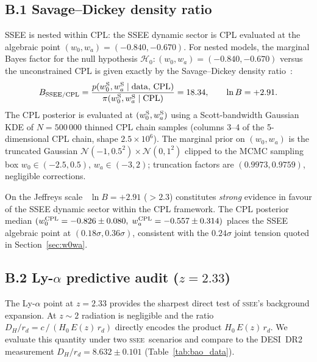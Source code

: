 \documentclass[12pt,a4paper]{article}
\newcommand{\SSEE}{\ifmmode\mathrm{SSEE}\else\textsc{ssee}\fi}
\begin{document}
\subsection*{B.1 Savage--Dickey density ratio}

SSEE is nested within CPL: the SSEE dynamic sector is CPL evaluated at
the algebraic point $(w_0,w_a)=(-0.840,-0.670)$.  For nested models,
the marginal Bayes factor for the null hypothesis $\mathcal{H}_0:
(w_0,w_a)=(-0.840,-0.670)$ versus the unconstrained CPL is given
exactly by the Savage--Dickey density
ratio~\cite{Verdinelli1995,Trotta2008}:
\begin{equation}
  B_{\rm SSEE/CPL} = \frac{p(w_0^{\rm S},w_a^{\rm S}\mid\text{data, CPL})}
                          {\pi(w_0^{\rm S},w_a^{\rm S}\mid\text{CPL})}
                   = 18.34, \qquad \ln B = +2.91.
\end{equation}
The CPL posterior is evaluated at $(w_0^{\rm S},w_a^{\rm S})$ using a
Scott-bandwidth Gaussian KDE of $N=500\,000$ thinned CPL chain samples
(columns 3--4 of the 5-dimensional CPL chain, shape $2.5\times10^6$).
The marginal prior on $(w_0,w_a)$ is the truncated Gaussian
$\mathcal{N}(-1,0.5^2)\times\mathcal{N}(0,1^2)$ clipped to the MCMC
sampling box $w_0\in(-2.5,0.5)$, $w_a\in(-3,2)$; truncation factors
are $(0.9973,0.9759)$, negligible corrections.

On the Jeffreys scale~\cite{Trotta2008} $\ln B=+2.91$ ($>2.3$) constitutes
\emph{strong} evidence in favour of the SSEE dynamic sector within
the CPL framework.  The CPL posterior median
$(w_0^{\rm CPL}=-0.826\pm0.080,\;w_a^{\rm CPL}=-0.557\pm0.314)$ places
the SSEE algebraic point at $(0.18\sigma,0.36\sigma)$, consistent with
the $0.24\sigma$ joint tension quoted in Section~\ref{sec:w0wa}.

\subsection*{B.2 Ly-$\alpha$ predictive audit ($z=2.33$)}
\label{app:lya}

The Ly-$\alpha$ point at $z=2.33$ provides the sharpest direct test of
\SSEE's background expansion.  At $z\sim2$ radiation is negligible and
the ratio $D_H/r_d = c\,/\,(H_0\,E(z)\,r_d)$ directly encodes the
product $H_0\,E(z)\,r_d$.  We evaluate this quantity under two
\SSEE\ scenarios and compare to the DESI~DR2 measurement
$D_H/r_d = 8.632\pm0.101$ (Table~\ref{tab:bao_data}).
\end{document}
